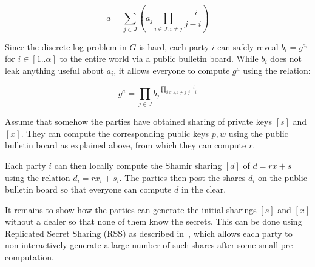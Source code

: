 \documentclass[11pt]{article}
\begin{document}
$$a = \sum_{j\in J}\left(a_j\prod_{i\in J, i\neq j}\frac{-i}{j-i}\right)$$


Since the discrete log problem in $G$ is hard, each party $i$ can safely reveal $b_i = g^{a_i}$ for $i \in [1..\alpha]$ to the entire world via a public bulletin board. While $b_i$ does not leak anything useful about $a_i$, it allows everyone to compute $g^a$ using the relation:

$$g^a = \prod_{j\in J}{b_j}^{\prod_{i\in J, i\neq j}\frac{-i}{j-i}}$$

Assume that somehow the parties have obtained sharing of private keys $[s]$ and $[x]$. They can compute the corresponding public keys $p, w$ using the public bulletin board as explained above, from which they can compute $r$. 

Each party $i$ can then locally compute the Shamir sharing $[d]$ of $d = rx+s$ using the relation $d_i = rx_i+s_i$.
The parties then post the shares $d_i$ on the public bulletin board so that everyone can compute $d$ in the clear.


It remains to show how the parties can generate the initial sharings $[s]$ and $[x]$ without a dealer so that none of them know the secrets. This can be done using Replicated Secret Sharing (RSS) as described in~\cite[Section 3.2.3]{SSCMD92}, which allows each party to non-interactively generate a large number of such shares after some small pre-computation.
\end{document}
